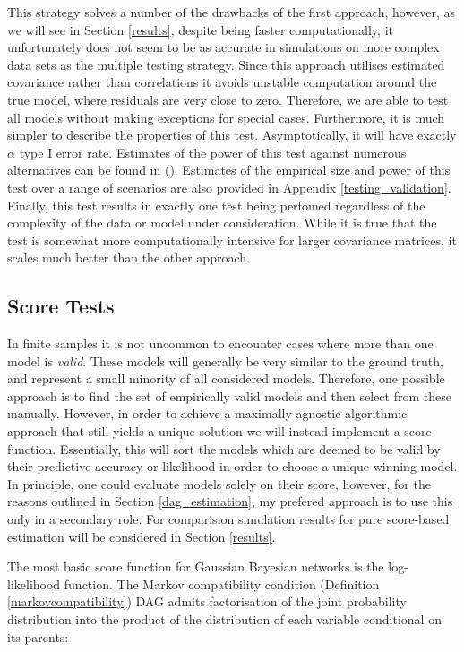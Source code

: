 \documentclass{article}
\begin{document}
This strategy solves a number of the drawbacks of the first approach, however, as we will see in Section \ref{results}, despite being faster computationally, it unfortunately does not seem to be as accurate in simulations on more complex data sets as the multiple testing strategy. Since this approach utilises estimated covariance rather than correlations it avoids unstable computation around the true model, where residuals are very close to zero. Therefore, we are able to test all models without making exceptions for special cases. Furthermore, it is much simpler to describe the properties of this test. Asymptotically, it will have exactly $\alpha$ type I error rate. Estimates of the power of this test against numerous alternatives can be found in \citeauthor{wang2013necessary} (\citeyear{wang2013necessary}). Estimates of the empirical size and power of this test over a range of scenarios are also provided in Appendix \ref{testing_validation}. Finally, this test results in exactly one test being perfomed regardless of the complexity of the data or model under consideration. While it is true that the test is somewhat more computationally intensive for larger covariance matrices, it scales much better than the other approach. 

\subsection{Score Tests} \label{scoretests}

In finite samples it is not uncommon to encounter cases where more than one model is \textit{valid}. These models will generally be very similar to the ground truth, and represent a small minority of all considered models. Therefore, one possible approach is to find the set of empirically valid models and then select from these manually. However, in order to achieve a maximally agnostic algorithmic approach that still yields a unique solution we will instead implement a score function. Essentially, this will sort the models which are deemed to be valid by their predictive accuracy or likelihood in order to choose a unique winning model. In principle, one could evaluate models solely on their score, however, for the reasons outlined in Section \ref{dag_estimation}, my prefered approach is to use this only in a secondary role. For comparision simulation results for pure score-based estimation will be  considered in Section \ref{results}.

The most basic score function for Gaussian Bayesian networks is the log-likelihood function. The Markov compatibility condition (Definition \ref{markovcompatibility}) DAG admits factorisation of the joint probability distribution into the product of the distribution of each variable conditional on its parents:
\end{document}
